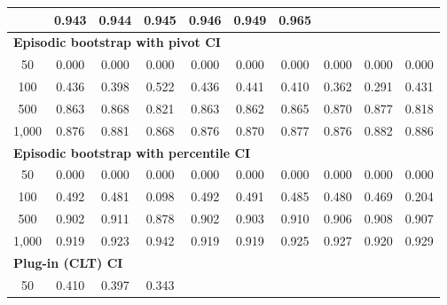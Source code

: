 \documentclass{article}
\numberwithin{equation}{section}
\begin{document}
\begin{table}[ht]
\begin{tabular}{c|ccc|cccccc}
& \cellcolor{covheat!96!white}0.943 & \cellcolor{covheat!97!white}0.944 & \cellcolor{covheat!98!white}0.945 & \cellcolor{covheat!98!white}0.946 & \cellcolor{covheat!100!white}0.949 & \cellcolor{covheat!100!white}0.965 \\
\hline
\multicolumn{10}{l}{\textbf{Episodic bootstrap with pivot CI}} \\ \hline
50
& 0.000 & 0.000 & 0.000
& 0.000 & 0.000 & 0.000 & 0.000 & 0.000 & 0.000 \\
100
& 0.436 & 0.398 & 0.522
& 0.436 & 0.441 & 0.410 & 0.362 & 0.291 & 0.431 \\
500
& \cellcolor{covheat!57!white}0.863 & \cellcolor{covheat!59!white}0.868 & \cellcolor{covheat!35!white}0.821
& \cellcolor{covheat!57!white}0.863 & \cellcolor{covheat!56!white}0.862 & \cellcolor{covheat!58!white}0.865 & \cellcolor{covheat!60!white}0.870 & \cellcolor{covheat!64!white}0.877 & \cellcolor{covheat!34!white}0.818 \\
1{,}000
& \cellcolor{covheat!63!white}0.876 & \cellcolor{covheat!66!white}0.881 & \cellcolor{covheat!59!white}0.868
& \cellcolor{covheat!63!white}0.876 & \cellcolor{covheat!60!white}0.870 & \cellcolor{covheat!64!white}0.877 & \cellcolor{covheat!63!white}0.876 & \cellcolor{covheat!66!white}0.882 & \cellcolor{covheat!68!white}0.886 \\
\hline
\multicolumn{10}{l}{\textbf{Episodic bootstrap with percentile CI}} \\ \hline
50
& 0.000 & 0.000 & 0.000
& 0.000 & 0.000 & 0.000 & 0.000 & 0.000 & 0.000 \\
100
& 0.492 & 0.481 & 0.098
& 0.492 & 0.491 & 0.485 & 0.480 & 0.469 & 0.204 \\
500
& \cellcolor{covheat!76!white}0.902 & \cellcolor{covheat!81!white}0.911 & \cellcolor{covheat!64!white}0.878
& \cellcolor{covheat!76!white}0.902 & \cellcolor{covheat!77!white}0.903 & \cellcolor{covheat!80!white}0.910 & \cellcolor{covheat!78!white}0.906 & \cellcolor{covheat!79!white}0.908 & \cellcolor{covheat!79!white}0.907 \\
1{,}000
& \cellcolor{covheat!85!white}0.919 & \cellcolor{covheat!87!white}0.923 & \cellcolor{covheat!96!white}0.942
& \cellcolor{covheat!85!white}0.919 & \cellcolor{covheat!85!white}0.919 & \cellcolor{covheat!88!white}0.925 & \cellcolor{covheat!89!white}0.927 & \cellcolor{covheat!85!white}0.920 & \cellcolor{covheat!90!white}0.929 \\
\hline
\multicolumn{10}{l}{\textbf{Plug-in (CLT) CI}} \\ \hline
50
& 0.410 & 0.397 & 0.343

\end{tabular}
\end{table}
\end{document}
